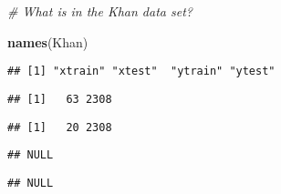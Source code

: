 \documentclass[]{article}
\newenvironment{Shaded}{\begin{snugshade}}{\end{snugshade}}
\newcommand{\KeywordTok}[1]{\textcolor[rgb]{0.13,0.29,0.53}{\textbf{#1}}}
\newcommand{\CommentTok}[1]{\textcolor[rgb]{0.56,0.35,0.01}{\textit{#1}}}
\newcommand{\OperatorTok}[1]{\textcolor[rgb]{0.81,0.36,0.00}{\textbf{#1}}}
\newcommand{\NormalTok}[1]{#1}
\begin{document}
\begin{Shaded}
\begin{Highlighting}[]
\CommentTok{# What is in the Khan data set?}

\KeywordTok{names}\NormalTok{(Khan)}
\end{Highlighting}
\end{Shaded}

\begin{verbatim}
## [1] "xtrain" "xtest"  "ytrain" "ytest"
\end{verbatim}

\begin{Shaded}
\end{Shaded}

\begin{verbatim}
## [1]   63 2308
\end{verbatim}

\begin{Shaded}
\end{Shaded}

\begin{verbatim}
## [1]   20 2308
\end{verbatim}

\begin{Shaded}
\end{Shaded}

\begin{verbatim}
## NULL
\end{verbatim}

\begin{Shaded}
\end{Shaded}

\begin{verbatim}
## NULL
\end{verbatim}
\end{document}
